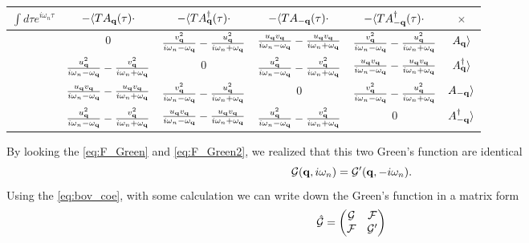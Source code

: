 \begin{center}
{\Large
\begin{fullwidth}
\begin{tabular}{||c|c|c|c|c|c||}
    \hline
    $\int d\tau e^{i\omega_n \tau}$ & $-\langle T A_{\mathbf{q}}(\tau) \cdot$ & $ -\langle T A_{\mathbf{q}}^\dagger(\tau) \cdot$ & $-\langle T A_{-\mathbf{q}}(\tau) \cdot$ & $ -\langle T A_{-\mathbf{q}}^\dagger(\tau) \cdot$ & $\times$ \\
    \hline
    ~ & $0$ &  \textcolor{NavyBlue}{$\frac{v_{\mathbf{q}}^2}{i\omega_n -\omega_{\mathbf{q}}} - \frac{u_{\mathbf{q}}^2}{i\omega_n+\omega_{\mathbf{q}}}$} & $\frac{u_{\mathbf{q}} v_{\mathbf{q}}}{i\omega_n-\omega_{\mathbf{q}}} - \frac{u_{\mathbf{q}} v_{\mathbf{q}}}{i\omega_n + \omega_{\mathbf{q}}}$ & \textcolor{NavyBlue}{$\frac{v_{\mathbf{q}}^2}{i\omega_n -\omega_{\mathbf{q}}} - \frac{u^2_{\mathbf{q}}}{i\omega_n+\omega_{\mathbf{q}}}$} & $A_{\mathbf{q}}\rangle$ \\
    \hline
    ~ & \textcolor{OliveGreen}{$\frac{u_{\mathbf{q}}^2}{i\omega_n-\omega_{\mathbf{q}}} - \frac{v_{\mathbf{q}}^2}{i\omega_n+\omega_{\mathbf{q}}}$} & $0$ & \textcolor{OliveGreen}{$\frac{u_{\mathbf{q}}^2}{i\omega_n-\omega_{\mathbf{q}}} - \frac{v_{\mathbf{q}}^2}{i\omega_n+\omega_{\mathbf{q}}}$} & $\frac{u_{\mathbf{q}} v_{\mathbf{q}}}{i\omega_n - \omega_{\mathbf{q}}} - \frac{u_{\mathbf{q}} v_{\mathbf{q}}}{i\omega_n + \omega_{\mathbf{q}}}$ & $A_{\mathbf{q}}^\dagger \rangle$ \\
    \hline
    ~ & $\frac{u_{\mathbf{q}} v_{\mathbf{q}}}{i\omega_n-\omega_{\mathbf{q}}} - \frac{u_{\mathbf{q}} v_{\mathbf{q}}}{i\omega_n + \omega_{\mathbf{q}}}$ & \textcolor{NavyBlue}{$\frac{v_{\mathbf{q}}^2}{i\omega_n -\omega_{\mathbf{q}}} - \frac{u_{\mathbf{q}}^2}{i\omega_n+\omega_{\mathbf{q}}}$} & $0$ & \textcolor{NavyBlue}{$\frac{v_{\mathbf{q}}^2}{i\omega_n -\omega_{\mathbf{q}}} - \frac{u^2_{\mathbf{q}}}{i\omega_n+\omega_{\mathbf{q}}}$} & $A_{-\mathbf{q}}\rangle$ \\
    \hline
    ~ & \textcolor{OliveGreen}{$\frac{u_{\mathbf{q}}^2}{i\omega_n-\omega_{\mathbf{q}}} - \frac{v_{\mathbf{q}}^2}{i\omega_n+\omega_{\mathbf{q}}}$} & $\frac{u_{\mathbf{q}} v_{\mathbf{q}}}{i\omega_n-\omega_{\mathbf{q}}} - \frac{u_{\mathbf{q}} v_{\mathbf{q}}}{i\omega_n + \omega_{\mathbf{q}}}$ & \textcolor{OliveGreen}{$\frac{u_{\mathbf{q}}^2}{i\omega_n-\omega_{\mathbf{q}}} - \frac{v_{\mathbf{q}}^2}{i\omega_n+\omega_{\mathbf{q}}}$} & $0$ & $A^\dagger_{-\mathbf{q}} \rangle$\\
    \hline
\end{tabular}
\end{fullwidth}
}
\end{center}

By looking the \eqref{eq:F_Green} and \eqref{eq:F_Green2}, we realized that this two Green's function are identical
\begin{equation}
  \mathcal{G}(\mathbf{q},i\omega_n) = \mathcal{G}'(\mathbf{q},-i\omega_n) \label{eq:F_Green_realition}.
\end{equation}
Using the \eqref{eq:bov_coe}, with some calculation we can write down the Green's function in a matrix form~\cite{christensen:15qp}
\begin{equation}
\hat{\mathcal{G}}=
  \begin{pmatrix}
    \mathcal{G} & \mathcal{F} \\
    \mathcal{F} & \mathcal{G}'
  \end{pmatrix}
\end{equation}

